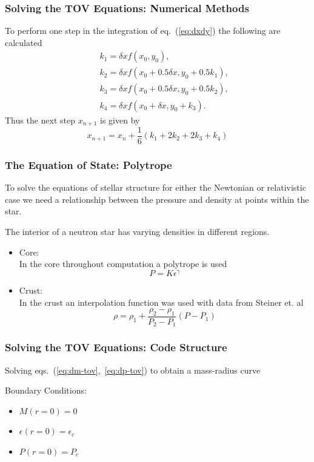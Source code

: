 \documentclass{beamer}
\begin{document}
\begin{frame}
\frametitle{Solving the TOV Equations: Numerical Methods}
To perform one step in the integration of eq.~(\ref{eq:dxdy}) the following are calculated
\begin{eqnarray}
&& k_1 = \delta x f(x_0,y_0), \\
&& k_2 = \delta x f(x_0 + 0.5\delta x, y_0 + 0.5 k_1), \\
&& k_3 = \delta x f(x_0 + 0.5 \delta x, y_0 + 0.5 k_2), \\
&& k_4 = \delta x f(x_0 + \delta x, y_0 + k_3).
\end{eqnarray}
Thus the next step $x_{n+1}$ is given by
\begin{equation}
x_{n+1} = x_n + \frac{1}{6}(k_1 + 2k_2 + 2k_3 + k_4)
\end{equation}
\end{frame}
\begin{frame}
\frametitle{The Equation of State: Polytrope}
To solve the equations of stellar structure for either the Newtonian or relativistic case we need a relationship between the pressure and density at points within the star.

The interior of a neutron star has varying densities in different regions. 

\begin{itemize}
\item Core:\\
In the core throughout computation a polytrope is used 
\begin{equation}\label{eq:eos_core}
P = K \epsilon^\gamma
\end{equation}
\item Crust: \\
In the crust an interpolation function was used with data from Steiner et. al
\begin{equation}\label{eq:interp}
\rho = \rho_1 + \frac{\rho_2 - \rho_1}{P_2 - P_1}(P - P_1)
\end{equation}
\end{itemize}
\end{frame}
\begin{frame}
\frametitle{Solving the TOV Equations: Code Structure}
Solving eqs.~(\ref{eq:dm-tov},~\ref{eq:dp-tov}) to obtain a mass-radius curve

Boundary Conditions:
\begin{itemize}
\item $M(r = 0) = 0$
\item $\epsilon(r = 0) = \epsilon_c$
\item $P(r = 0) = P_c$
\end{itemize}
\end{frame}
\end{document}
